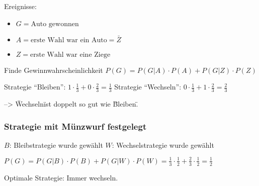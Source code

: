\documentclass[10pt,a4paper]{scrartcl}
\begin{document}
Ereignisse:
\begin{itemize}
\item $G = \mbox{Auto gewonnen}$
\item $A = \mbox{erste Wahl war ein Auto} = \bar{Z}$
\item $Z = \mbox{erste Wahl war eine Ziege}$
\end{itemize}

Finde Gewinnwahrscheinlichkeit
$P(G) = P(G|A) \cdot P(A) + P(G|Z) \cdot P(Z)$

Strategie ``Bleiben'': $1 \cdot \frac{1}{3} + 0 \cdot \frac{2}{3} = \frac{1}{3}$
Strategie ``Wechseln'': $0 \cdot \frac{1}{3} + 1 \cdot \frac{2}{3} = \frac{2}{3}$

--> \"Wechseln\" ist doppelt so gut wie \"Bleiben\".

\subsubsection{Strategie mit Münzwurf festgelegt}
$B$: Bleibstrategie wurde gewählt
$W$: Wechselstrategie wurde gewählt

$P(G) = P(G|B) \cdot P(B) + P(G|W) \cdot P(W)
	= \frac{1}{3}\cdot\frac{1}{2} + \frac{2}{3}\cdot\frac{1}{2} = \frac{1}{2}$

Optimale Strategie: Immer wechseln.
\end{document}

